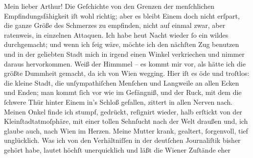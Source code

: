 \pstart\center{}Mein lieber Arthur!\pend\vspace{0.5em}
\pstart
           Die Geſchichte von den Grenzen der menſchlichen Empfindungsfähigkeit iſt wohl
               richtig; aber es bleibt Einem doch nicht erſpart, die ganze Größe des Schmerzes zu
               empfinden, nicht auf einmal zwar, aber ratenweis, in einzelnen Attaquen. Ich habe
                  heut{ }Nacht wieder ſo ein wildes \label{K_L02660-1v}\label{K_L02660-1} durchgemacht; und wenn ich feig wäre, möchte ich den nächſten Zug
               benutzen und in der geliebten Stadt mich in irgend einen Winkel verkriechen und nimmer daraus
               hervorkommen. Weiß der Himmmel – es kommt mir vor, als hätte ich die größte Dummheit
               gemacht, da ich von Wien wegging. Hier iſt es öde
               und troſtlos: die kleine Stadt,
               die unſympathiſchen Menſchen und Langweile an allen Ecken und Enden; man kommt ſich
               vor wie im Gefängniß, und der Ruck, mit dem {\pb}die
               ſchwere Thür hinter Einem in’s Schloß gefallen, zittert in allen Nerven nach. Meinen
                  Onkel finde ich stumpf,
               gedrückt, reſignirt wieder, halb erſtickt von der Kleinſtadtatmoſphäre, mit einer
               tollen Sehnſucht nach der Welt draußen und, ich glaube auch, nach Wien im Herzen. Meine Mutter krank, gealtert, ſorgenvoll, tief unglücklich. Was ich
               von den Verhältniſſen in der deutſchen Journaliſtik bisher gehört habe, lautet höchſt
               unerquicklich und läßt die Wiener Zuſtände eher
